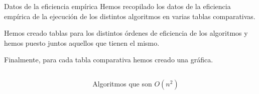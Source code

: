 \documentclass[spanish]{beamer}
\begin{document}
\begin{frame}
	\begin{center}
		
	\end{center}
\end{frame}

\begin{frame}{Datos de la eficiencia empírica}
	Hemos recopilado los datos de la eficiencia empírica de la ejecución de los distintos algoritmos en varias tablas comparativas.
	
	\vskip 0.5cm
	
	Hemos creado tablas para los distintos órdenes de eficiencia de los algoritmos y hemos puesto juntos aquellos que tienen el mismo.
	
	\vskip 0.5cm
	
	Finalmente, para cada tabla comparativa hemos creado una gráfica.
	
\end{frame}


\burbujalinuxOCero
	\seleccionlinuxOCero
	\insercionlinuxOCero
	
	 {\burbujalinuxOCero}
	 {\burbujalinuxOCero}
	 {\burbujalinuxOCero}

\begin{frame}
	\begin{columns}[c] %
		\begin{column}{.6\textwidth}
			\resizebox*{!}{9cm}{
				\pgfplotstabletypeset[columns={0, Burbuja, Inserción, Selección}]{\burbujalinuxOCero}
			}
		\end{column}%
		
		\hfill%
		
		\begin{column}{.3\textwidth}
			Algoritmos que son $O(n^2)$
		\end{column}%
		
	\end{columns}
\end{frame}
\end{document}

